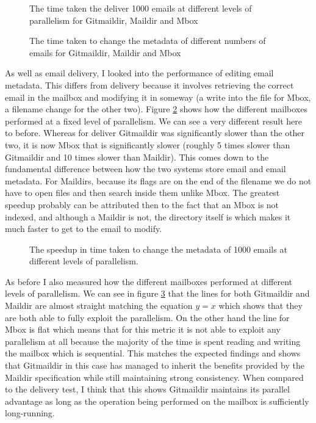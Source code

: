 \begin{figure}[h]
    \centering
    
    \caption{The time taken the deliver 1000 emails at different levels of parallelism for Gitmaildir, Maildir and Mbox}
    \label{fig:tdpp_combined}
\end{figure}

\begin{figure}[h]
    \centering
    
    \caption{The time taken to change the metadata of different numbers of emails for Gitmaildir, Maildir and Mbox}
    \label{fig:tmp_combined}
\end{figure}

As well as email delivery, I looked into the performance of editing email metadata. This differs from delivery because it involves retrieving the correct email in the mailbox and modifying it in someway (a write into the file for Mbox, a filename change for the other two). Figure \ref{fig:tmp_combined} shows how the different mailboxes performed at a fixed level of parallelism. We can see a very different result here to before. Whereas for deliver Gitmaildir was significantly slower than the other two, it is now Mbox that is significantly slower (roughly 5 times slower than Gitmaildir and 10 times slower than Maildir). This comes down to the fundamental difference between how the two systems store email and email metadata. For Maildirs, because its flags are on the end of the filename we do not have to open files and then search inside them unlike Mbox. The greatest speedup probably can be attributed then to the fact that an Mbox is not indexed, and although a Maildir is not, the directory itself is which makes it much faster to get to the email to modify.

\begin{figure}[h]
    \centering
    
    \caption{The speedup in time taken to change the metadata of 1000 emails at different levels of parallelism.}
    \label{fig:tmpp_speedup_combined}
\end{figure}

As before I also measured how the different mailboxes performed at different levels of parallelism. We can see in figure \ref{fig:tmpp_speedup_combined} that the lines for both Gitmaildir and Maildir are almost straight matching the equation $y=x$ which shows that they are both able to fully exploit the parallelism. On the other hand the line for Mbox is flat which means that for this metric it is not able to exploit any parallelism at all because the majority of the time is spent reading and writing the mailbox which is sequential. This matches the expected findings and shows that Gitmaildir in this case has managed to inherit the benefits provided by the Maildir specification while still maintaining strong consistency. When compared to the delivery test, I think that this shows Gitmaildir maintains its parallel advantage as long as the operation being performed on the mailbox is sufficiently long-running.

